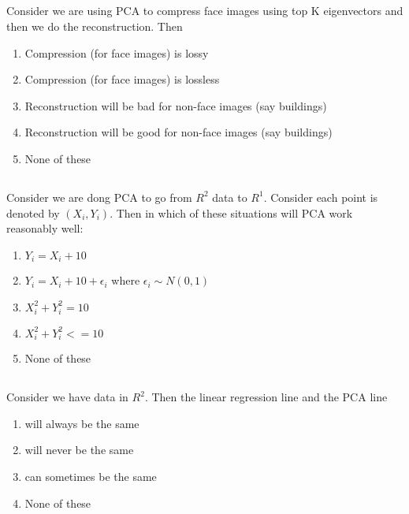 \begin{frame}
\section{}
  Consider we are using PCA to compress face images using top K eigenvectors and then we do the reconstruction. Then
    \begin{enumerate}[label=(\Alph*)]
      \item Compression (for face images) is lossy     %
      \item Compression (for face images) is lossless
      \item Reconstruction will be bad for non-face images (say buildings)     %
      \item Reconstruction will be good for non-face images (say buildings)
      \item None of these     %
    \end{enumerate}
\end{frame}

\begin{frame}
\section{}
  Consider we are dong PCA to go from $R^2$ data to $R^1$. Consider each point is denoted by $(X_i,Y_i)$. Then in which of these situations will PCA work reasonably well:
     \begin{enumerate}[label=(\Alph*)]
       \item $Y_i=X_i+10$   %
      \item $Y_i=X_i+10+\epsilon_i$ where $\epsilon_i\sim N(0,1)$     %
      \item $X_i^2+Y_i^2 = 10$
      \item $X_i^2+Y_i^2 <= 10$
      \item None of these   %
     \end{enumerate}
\end{frame}

\begin{frame}
\section{}
  Consider we have data in $R^2$. Then the linear regression line and the PCA line
    \begin{enumerate}[label=(\Alph*)]
      \item will always be the same
     \item will never be the same
     \item can sometimes be the same    %
     \item None of these    %
    \end{enumerate}
\end{frame}

